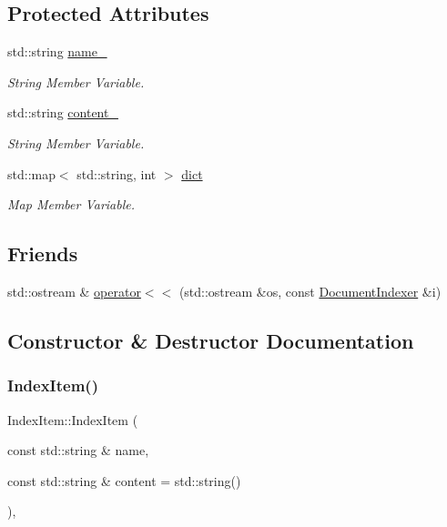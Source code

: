 \subsection*{Protected Attributes}
\begin{DoxyCompactItemize}
\item 
std\+::string \hyperlink{class_index_item_a803a48d6e32976f6c9c42e83b10f61c5}{name\+\_\+}
\begin{DoxyCompactList}\small\item\em String Member Variable. \end{DoxyCompactList}\item 
std\+::string \hyperlink{class_index_item_a5d2cd643f9b1749810b4f5ea479925ed}{content\+\_\+}
\begin{DoxyCompactList}\small\item\em String Member Variable. \end{DoxyCompactList}\item 
std\+::map$<$ std\+::string, int $>$ \hyperlink{class_index_item_a819728205ae50085a6bd2456ce8c556b}{dict}
\begin{DoxyCompactList}\small\item\em Map Member Variable. \end{DoxyCompactList}\end{DoxyCompactItemize}
\subsection*{Friends}
\begin{DoxyCompactItemize}
\item 
std\+::ostream \& \hyperlink{class_index_item_a09373f25959741150437b95f15ae11e2}{operator$<$$<$} (std\+::ostream \&os, const \hyperlink{class_document_indexer}{Document\+Indexer} \&i)
\end{DoxyCompactItemize}


\subsection{Constructor \& Destructor Documentation}
\mbox{\label{class_index_item_a9fcaaa46fb93a873ad73dc1ebdec8163}} 
\subsubsection{\texorpdfstring{Index\+Item()}{IndexItem()}}
{\footnotesize\ttfamily Index\+Item\+::\+Index\+Item (\begin{DoxyParamCaption}\item[{const std\+::string \&}]{name,  }\item[{const std\+::string \&}]{content = {\ttfamily std\+:\+:string()} }\end{DoxyParamCaption})\hspace{0.3cm}{\ttfamily [inline]}, {\ttfamily [explicit]}}



